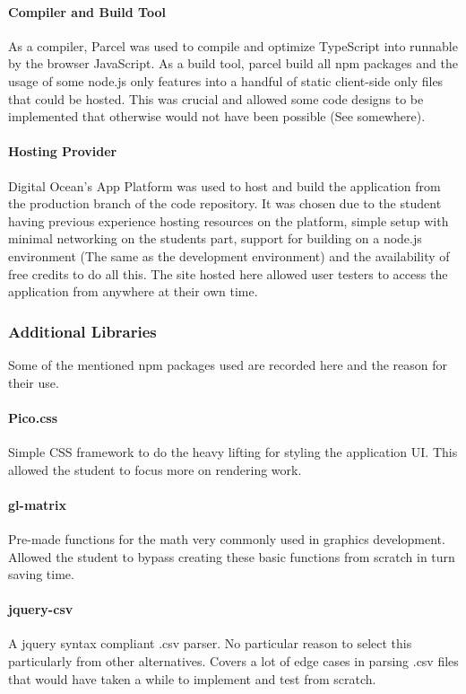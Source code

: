 \paragraph{Compiler and Build Tool}
As a compiler, Parcel was used to compile and optimize TypeScript into runnable by the browser JavaScript. As a build tool, parcel build all npm packages and the usage of some node.js only features into a handful of static client-side only files that could be hosted. This was crucial and allowed some code designs to be implemented that otherwise would not have been possible (See somewhere).

\paragraph{Hosting Provider}
Digital Ocean's App Platform was used to host and build the application from the production branch of the code repository. It was chosen due to the student having previous experience hosting resources on the platform, simple setup with minimal networking on the students part, support for building on a node.js environment (The same as the development environment) and the availability of free credits to do all this. The site hosted here allowed user testers to access the application from anywhere at their own time.

\subsubsection{Additional Libraries}
Some of the mentioned npm packages used are recorded here and the reason for their use.

\paragraph{Pico.css}
Simple CSS framework to do the heavy lifting for styling the application UI. This allowed the student to focus more on rendering work.

\paragraph{gl-matrix}
Pre-made functions for the math very commonly used in graphics development. Allowed the student to bypass creating these basic functions from scratch in turn saving time.

\paragraph{jquery-csv}
A jquery syntax compliant .csv parser. No particular reason to select this particularly from other alternatives. Covers a lot of edge cases in parsing .csv files that would have taken a while to implement and test from scratch.

